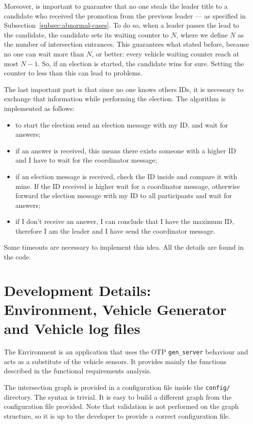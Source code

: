 \documentclass{memoir}
\begin{document}
Moreover, is important to guarantee that no one steals the leader title to a candidate who received the promotion from the previous leader --- as specified in Subsection~\ref{subsec:abnormal-cases}. To do so, when a leader passes the lead to the candidate, the candidate sets its waiting counter to $N$, where we define $N$ as the number of intersection entrances. This guarantees what stated before, because no one can wait more than $N$, or better: every vehicle waiting counter reach at most $N - 1$. So, if an election is started, the candidate wins for sure. Setting the counter to less than this can lead to problems.

The last important part is that since no one knows others IDs, it is necessary to exchange that information while performing the election. The algorithm is implemented as follows:

\begin{itemize}
	\item to start the election send an election message with my ID, and wait for answers;
	\item if an answer is received, this means there exists someone with a higher ID and I have to wait for the coordinator message;
	\item if an election message is received, check the ID inside and compare it with mine. If the ID received is higher wait for a coordinator message, otherwise forward the election message with my ID to all participants and wait for answers;
	\item if I don't receive an answer, I can conclude that I have the maximum ID, therefore I am the leader and I have send the coordinator message.
\end{itemize}

Some timeouts are necessary to implement this idea. All the details are found in the code.

\section{Development Details: Environment, Vehicle Generator and Vehicle log files}
The Environment is an application that uses the OTP \verb|gen_server| behaviour and acts as a substitute of the vehicle sensors. It provides mainly the functions described in the functional requirements analysis.

The intersection graph is provided in a configuration file inside the \verb|config/| directory. The syntax is trivial. It is easy to build a different graph from the configuration file provided. Note that validation is not performed on the graph structure, so it is up to the developer to provide a correct configuration file.
\end{document}
